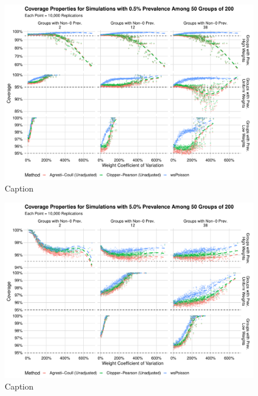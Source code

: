 \documentclass[AMA,STIX1COL]{WileyNJD-v2}
\begin{document}
\begin{figure}
    \centering
    \includegraphics[width=\textwidth]{figures/perfect_coverage_50_0_005_reduced.pdf}
    \caption{Caption}
    \label{fig:perfect_coverage_50_0_005_reduced}
\end{figure}


\begin{figure}
    \centering
    \includegraphics[width=\textwidth]{figures/perfect_coverage_50_0_05_reduced.pdf}
    \caption{Caption}
    \label{fig:perfect_coverage_50_0_05_reduced}
\end{figure}
\end{document}
